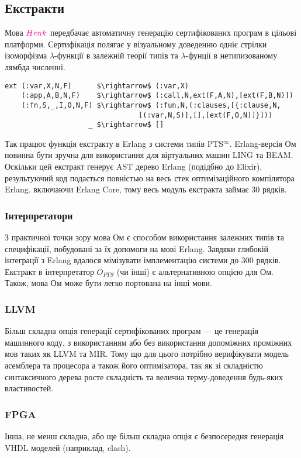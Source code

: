 \newpage
\subsection*{Екстракти}
Мова $\textcolor{magenta}{Henk}$ передбачає автоматичну генерацію сертифікованих програм в цільові платформи.
Сертифікація полягає у візуальному доведенню одніє стрілки ізоморфізма
$\lambda$-функції в залежній теорії типів та $\lambda$-фунції в нетипизованому лямбда численні.

\begin{lstlisting}[mathescape=true]
ext (:var,X,N,F)      $\rightarrow$ (:var,X)
    (:app,A,B,N,F)    $\rightarrow$ (:call,N,ext(F,A,N),[ext(F,B,N)])
    (:fn,S,_,I,O,N,F) $\rightarrow$ (:fun,N,(:clauses,[{:clause,N,
                                [(:var,N,S)],[],[ext(F,O,N)]}]))
                    _ $\rightarrow$ []
\end{lstlisting}

Так працює функція екстракту в Erlang з системи типів PTS$^\infty$.
Erlang-версія Ом повинна бути зручна для використання для
віртуальних машин LING та BEAM. Оскільки цей екстракт генерує
AST дерево Erlang (подідбно до Elixir), результуючий код
подається повністью на весь стек оптимізаційного компілятора
Erlang. включаючи Erlang Core, тому весь модуль екстракта займає 30 рядків.

\newpage
\subsubsection{Інтерпретатори}
З практичної точки зору мова Ом є способом використання залежних типів
та специфікації, побудовані за їх допомоги на мові Erlang.
Завдяки глибокій інтеграції з Erlang вдалося мімізувати імплементацію системи до 300 рядків.
Екстракт в інтерпретатор $O_{PTS}$ (чи інші) є альтернативною опцією для Ом.
Також, мова Ом може бути легко портована на інші мови.

\subsubsection{LLVM}
Більш складна опція генерації сертифікованих програм --- це генерація машинного коду,
з використанням або без використання допоміжних проміжних мов таких як LLVM та MIR.
Тому що для цього потрібно верифікувати модель асемблера та процесора а також
його оптимізатора, так як зі складністю синтаксичного дерева росте складність
та велична терму-доведення будь-яких властивостей.

\subsubsection{FPGA}
Інша, не менш складна, або ще більш складна опція є безпосередня генерація
VHDL моделей (наприклад, clash).

